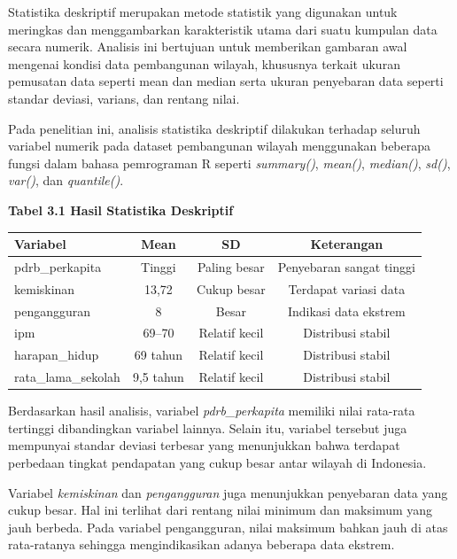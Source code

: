 \documentclass[
  12pt,
]{article}
\begin{document}
Statistika deskriptif merupakan metode statistik yang digunakan untuk
meringkas dan menggambarkan karakteristik utama dari suatu kumpulan data
secara numerik. Analisis ini bertujuan untuk memberikan gambaran awal
mengenai kondisi data pembangunan wilayah, khususnya terkait ukuran
pemusatan data seperti mean dan median serta ukuran penyebaran data
seperti standar deviasi, varians, dan rentang nilai.

Pada penelitian ini, analisis statistika deskriptif dilakukan terhadap
seluruh variabel numerik pada dataset pembangunan wilayah menggunakan
beberapa fungsi dalam bahasa pemrograman R seperti \textit{summary()},
\textit{mean()}, \textit{median()}, \textit{sd()}, \textit{var()}, dan
\textit{quantile()}.

\begin{center}
\textbf{Tabel 3.1 Hasil Statistika Deskriptif}

\begin{tabular}{|l|c|c|c|}
\hline
\textbf{Variabel} & \textbf{Mean} & \textbf{SD} & \textbf{Keterangan} \\
\hline
pdrb\_perkapita & Tinggi & Paling besar & Penyebaran sangat tinggi \\
\hline
kemiskinan & 13,72 & Cukup besar & Terdapat variasi data \\
\hline
pengangguran & 8 & Besar & Indikasi data ekstrem \\
\hline
ipm & 69--70 & Relatif kecil & Distribusi stabil \\
\hline
harapan\_hidup & 69 tahun & Relatif kecil & Distribusi stabil \\
\hline
rata\_lama\_sekolah & 9,5 tahun & Relatif kecil & Distribusi stabil \\
\hline
\end{tabular}

\end{center}

Berdasarkan hasil analisis, variabel \textit{pdrb\_perkapita} memiliki
nilai rata-rata tertinggi dibandingkan variabel lainnya. Selain itu,
variabel tersebut juga mempunyai standar deviasi terbesar yang
menunjukkan bahwa terdapat perbedaan tingkat pendapatan yang cukup besar
antar wilayah di Indonesia.

Variabel \textit{kemiskinan} dan \textit{pengangguran} juga menunjukkan
penyebaran data yang cukup besar. Hal ini terlihat dari rentang nilai
minimum dan maksimum yang jauh berbeda. Pada variabel pengangguran,
nilai maksimum bahkan jauh di atas rata-ratanya sehingga mengindikasikan
adanya beberapa data ekstrem.
\end{document}
